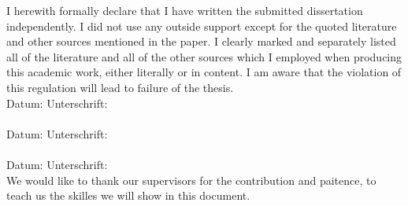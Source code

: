 \label{Stde}

I herewith formally declare that I have written the submitted dissertation independently. I did not use any outside support except for the quoted literature and other sources mentioned in the paper.
I clearly marked and separately listed all of the literature and all of the other sources which I employed when producing this academic work, either literally or in content.
I am aware that the violation of this regulation will lead to failure of the thesis.
\\[1.5cm]
Datum:	\hrulefill\enspace Unterschrift: \hrulefill
\\[3.5cm]
\\[1.5cm]
Datum:	\hrulefill\enspace Unterschrift: \hrulefill
\\[3.5cm]
\\[1.5cm]
Datum:	\hrulefill\enspace Unterschrift: \hrulefill
\\[3.5cm]
\newpage
{}
\label{noofth}
We would like to thank our supervisors for the contribution and paitence, to teach us the skilles we will show in this document.